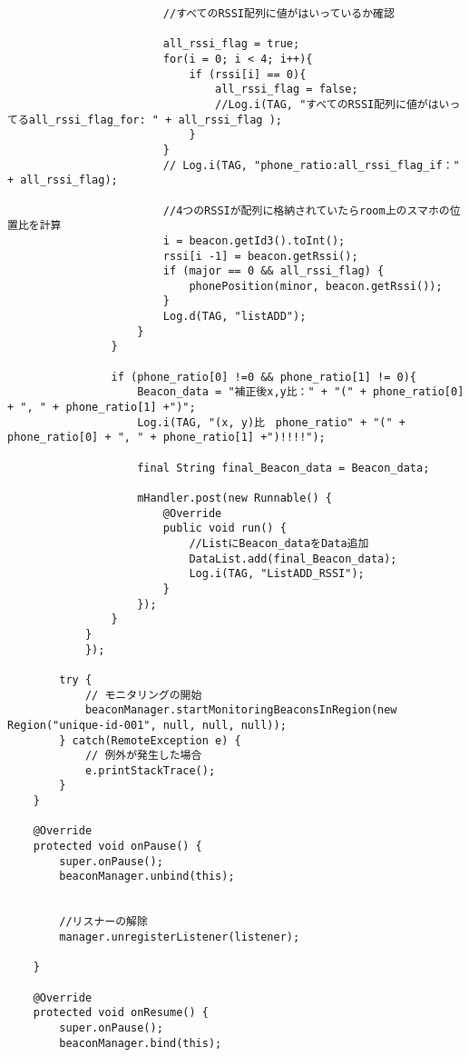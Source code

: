 \documentclass[11pt,a4j]{jarticle}
\begin{document}
\begin{verbatim}
                        //すべてのRSSI配列に値がはいっているか確認

                        all_rssi_flag = true;
                        for(i = 0; i < 4; i++){
                            if (rssi[i] == 0){
                                all_rssi_flag = false;
                                //Log.i(TAG, "すべてのRSSI配列に値がはいってるall_rssi_flag_for: " + all_rssi_flag );
                            }
                        }
                        // Log.i(TAG, "phone_ratio:all_rssi_flag_if：" + all_rssi_flag);

                        //4つのRSSIが配列に格納されていたらroom上のスマホの位置比を計算
                        i = beacon.getId3().toInt();
                        rssi[i -1] = beacon.getRssi();
                        if (major == 0 && all_rssi_flag) {
                            phonePosition(minor, beacon.getRssi());
                        }
                        Log.d(TAG, "listADD");
                    }
                }

                if (phone_ratio[0] !=0 && phone_ratio[1] != 0){
                    Beacon_data = "補正後x,y比：" + "(" + phone_ratio[0] + ", " + phone_ratio[1] +")";
                    Log.i(TAG, "(x, y)比　phone_ratio" + "(" + phone_ratio[0] + ", " + phone_ratio[1] +")!!!!");

                    final String final_Beacon_data = Beacon_data;

                    mHandler.post(new Runnable() {
                        @Override
                        public void run() {
                            //ListにBeacon_dataをData追加
                            DataList.add(final_Beacon_data);
                            Log.i(TAG, "ListADD_RSSI");
                        }
                    });
                }
            }
            });

        try {
            // モニタリングの開始
            beaconManager.startMonitoringBeaconsInRegion(new Region("unique-id-001", null, null, null));
        } catch(RemoteException e) {
            // 例外が発生した場合
            e.printStackTrace();
        }
    }

    @Override
    protected void onPause() {
        super.onPause();
        beaconManager.unbind(this);


        //リスナーの解除
        manager.unregisterListener(listener);

    }

    @Override
    protected void onResume() {
        super.onPause();
        beaconManager.bind(this);


\end{verbatim}
\end{document}

